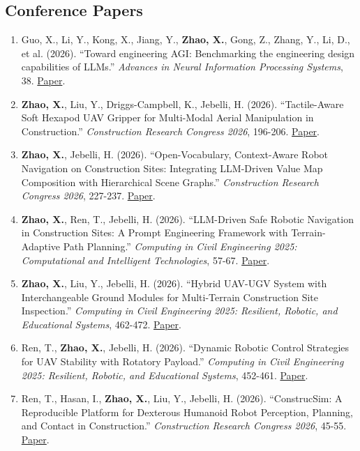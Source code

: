 \subsection*{Conference Papers}
\begin{enumerate}[leftmargin=1.5em, resume]
\item Guo, X., Li, Y., Kong, X., Jiang, Y., \textbf{Zhao, X.}, Gong, Z., Zhang, Y., Li, D., et al. (2026). ``Toward engineering AGI: Benchmarking the engineering design capabilities of LLMs.'' \textit{Advances in Neural Information Processing Systems}, 38. \href{https://proceedings.neurips.cc/paper_files/paper/2025/hash/664f777548205fb6e0cbb0965e8d2e16-Abstract-Datasets_and_Benchmarks_Track.html}{Paper}.
\item \textbf{Zhao, X.}, Liu, Y., Driggs-Campbell, K., Jebelli, H. (2026). ``Tactile-Aware Soft Hexapod UAV Gripper for Multi-Modal Aerial Manipulation in Construction.'' \textit{Construction Research Congress 2026}, 196-206. \href{https://ascelibrary.org/doi/abs/10.1061/9780784486979.019}{Paper}.
\item \textbf{Zhao, X.}, Jebelli, H. (2026). ``Open-Vocabulary, Context-Aware Robot Navigation on Construction Sites: Integrating LLM-Driven Value Map Composition with Hierarchical Scene Graphs.'' \textit{Construction Research Congress 2026}, 227-237. \href{https://ascelibrary.org/doi/abs/10.1061/9780784486979.022}{Paper}.
\item \textbf{Zhao, X.}, Ren, T., Jebelli, H. (2026). ``LLM-Driven Safe Robotic Navigation in Construction Sites: A Prompt Engineering Framework with Terrain-Adaptive Path Planning.'' \textit{Computing in Civil Engineering 2025: Computational and Intelligent Technologies}, 57-67. \href{https://ascelibrary.org/doi/abs/10.1061/9780784486436.007}{Paper}.
\item \textbf{Zhao, X.}, Liu, Y., Jebelli, H. (2026). ``Hybrid UAV-UGV System with Interchangeable Ground Modules for Multi-Terrain Construction Site Inspection.'' \textit{Computing in Civil Engineering 2025: Resilient, Robotic, and Educational Systems}, 462-472. \href{https://ascelibrary.org/doi/abs/10.1061/9780784486443.051}{Paper}.
\item Ren, T., \textbf{Zhao, X.}, Jebelli, H. (2026). ``Dynamic Robotic Control Strategies for UAV Stability with Rotatory Payload.'' \textit{Computing in Civil Engineering 2025: Resilient, Robotic, and Educational Systems}, 452-461. \href{https://ascelibrary.org/doi/abs/10.1061/9780784486443.050}{Paper}.
\item Ren, T., Hasan, I., \textbf{Zhao, X.}, Liu, Y., Jebelli, H. (2026). ``ConstrucSim: A Reproducible Platform for Dexterous Humanoid Robot Perception, Planning, and Contact in Construction.'' \textit{Construction Research Congress 2026}, 45-55. \href{https://ascelibrary.org/doi/abs/10.1061/9780784486979.005}{Paper}.

\end{enumerate}

